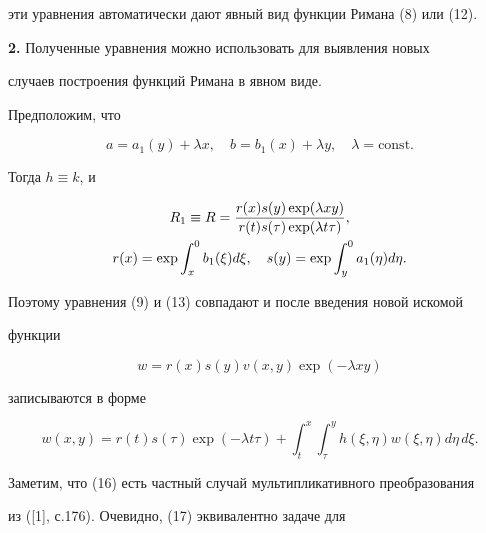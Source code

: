 эти уравнения автоматически дают явный вид функции Римана (8) или (12).


\medskip





{\bf 2.} Полученные уравнения можно использовать для выявления новых


случаев построения функций Римана в явном виде.





Предположим, что


\begin{equation}


a=a_1(y)+\lambda x,\quad b=b_1(x)+\lambda y,\quad


\lambda=\text{const}.


\end{equation}


Тогда $h\equiv k$, и


\begin{gather}


R_1\equiv R=


\frac{r(x)s(y)\exp(\lambda xy)}


{r(t)s(\tau)\exp(\lambda t\tau)},\notag \\


r(x)=\exp \int^0_x b_1(\xi)d\xi,\quad


s(y)=\exp \int^0_y a_1(\eta)d\eta.


\end{gather}


Поэтому уравнения (9) и (13) совпадают и после введения новой искомой


функции


\begin{equation}


w=r(x)s(y)v(x,y)\exp(-\lambda xy)


\end{equation}


записываются в форме


\begin{equation}


w(x,y)=r(t)s(\tau)\exp(-\lambda t\tau)+


\int^x_t \int^y_\tau h(\xi,\eta)w(\xi,\eta)d\eta\,d\xi.


\end{equation}


Заметим, что (16) есть частный случай мультипликативного преобразования


из ([1], с.176). Очевидно, (17) эквивалентно задаче для


